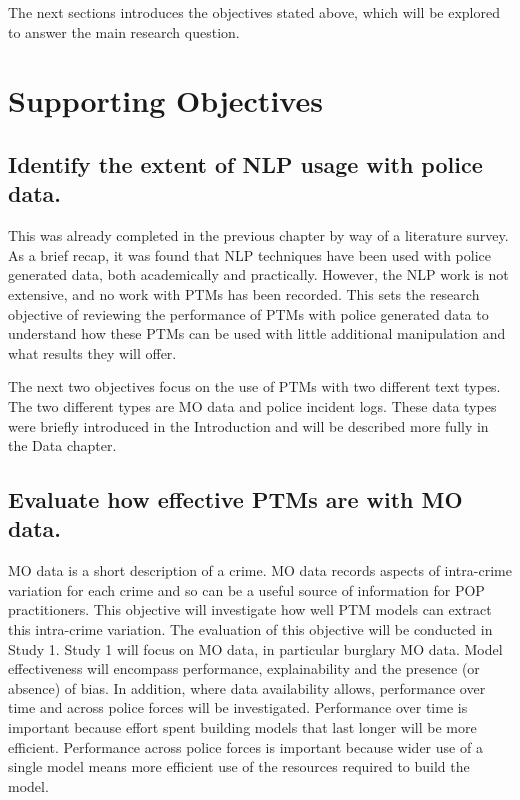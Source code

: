 The next sections introduces the objectives stated above, which will be explored to answer the main research question.
 



\section{Supporting Objectives} 




\subsection{Identify the extent of NLP usage with police data.}  This was already completed in the previous chapter by way of a literature survey. As a brief recap, it was found that NLP techniques have been used with police generated data, both academically and practically. However, the NLP work is not extensive, and no work with PTMs has been recorded. This sets the research objective of reviewing the performance of PTMs with police generated data to understand how these PTMs can be used with little additional manipulation and what results they will offer.

The next two objectives focus on the use of PTMs with two different text types. The two different types are MO data and police incident logs. These data types were briefly introduced in the Introduction and will be described more fully in the Data chapter.


\subsection{Evaluate how effective PTMs are with MO data.} MO data is a short description of a crime. MO data records aspects of intra-crime variation for each crime and so can be a useful source of information for POP practitioners. This objective will investigate how well PTM models can extract this intra-crime variation. The evaluation of this objective will be conducted in Study 1. Study 1 will focus on MO data, in particular burglary MO data. Model effectiveness will encompass performance, explainability and the presence (or absence) of bias. In addition, where data availability allows, performance over time and across police forces will be investigated. Performance over time is important because effort spent building models that last longer will be more efficient. Performance across police forces is important because wider use of a single model means more efficient use of the resources required to build the model.

